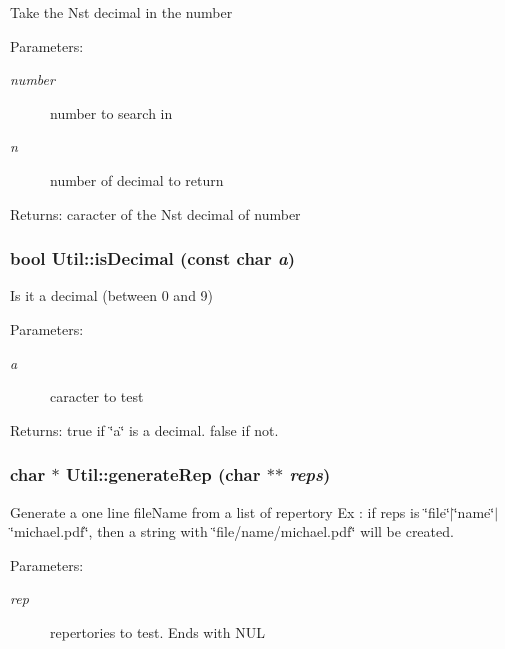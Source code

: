 Take the Nst decimal in the number \begin{Desc}
\item[Parameters:]
\begin{description}
\item[{\em number}]number to search in \item[{\em n}]number of decimal to return \end{description}
\end{Desc}
\begin{Desc}
\item[Returns:]caracter of the Nst decimal of number \end{Desc}
\subsubsection{\setlength{\rightskip}{0pt plus 5cm}bool Util::isDecimal (const char {\em a})\hspace{0.3cm}{\tt  [static]}}\label{classUtil_80a8dedaa94e2901a271a304cf665ef0}


Is it a decimal (between 0 and 9) \begin{Desc}
\item[Parameters:]
\begin{description}
\item[{\em a}]caracter to test \end{description}
\end{Desc}
\begin{Desc}
\item[Returns:]true if \char`\"{}a\char`\"{} is a decimal. false if not. \end{Desc}
\subsubsection{\setlength{\rightskip}{0pt plus 5cm}char $\ast$ Util::generateRep (char $\ast$$\ast$ {\em reps})\hspace{0.3cm}{\tt  [static]}}\label{classUtil_449426a320a40a270f6d107f2f6add88}


Generate a one line fileName from a list of repertory Ex : if reps is \char`\"{}file\char`\"{}$|$\char`\"{}name\char`\"{}$|$\char`\"{}michael.pdf\char`\"{}, then a string with \char`\"{}file/name/michael.pdf\char`\"{} will be created. \begin{Desc}
\item[Parameters:]
\begin{description}
\item[{\em rep}]repertories to test. Ends with NUL \end{description}
\end{Desc}
